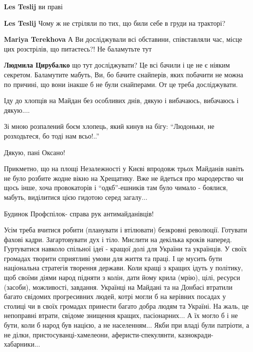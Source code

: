 \begin{itemize}
\begin{itemize}
\textbf{Les Teslij} ви праві

\textbf{Les Teslij} Чому ж не стріляли по тих, що били себе в груди на тракторі?

\textbf{Mariya Terekhova} А Ви досліджували всі обставини, співставляли час, місце цих розстрілів, що питаєтесь?! Не баламутьте тут

\textbf{Людмила Цирубалко} що тут досліджувати? Це всі бачили і це не є ніяким секретом. Баламутите мабуть, Ви, бо бачите снайперів, яких побачити не можна по причині, що вони інакше б не були снайперами. От це треба досліджувати.

\end{itemize} %


Іду до хлопців на Майдан без особливих днів, дякую і вибачаюсь, вибачаюсь і
дякую....

Зі мною розпалений боєм хлопець, який кинув на бігу: \enquote{Людоньки, не розходьтеся,
бо тоді нам всьо!..}

Дякую, пані Оксано!



Прикметно, що на площі Незалежності у Києві впродовж трьох Майданів навіть не
було розбите жодне вікно на Хрещатику. Вже не йдеться про мародерство чи щось
інше, хоча провокаторів і \enquote{одкб}-ешників там було чимало - боялися, мабуть,
виділитися цією гидотою серед загалу...

Будинок Профспілок- справа рук антимайданівців!



Усім треба вчитися робити (планувати і втілювати) безкровні революції. Готувати
фахові кадри. Загартовувати дух і тіло. Мислити на декілька кроків наперед.
Гуртуватися навколо спільної ідеї - кращої долі для України та українців. У
своїх громадах творити сприятливі умови для життя та праці. І це мусить бути
національна стратегія творення держави. Коли кращі з кращих ідуть у політику,
щоб своїми діями народ підняти з колін, дати йому крила (мрію), цілі, ресурси
(засоби), можливості, завдання. Українці на Майдані та на Донбасі втратили
багато свідомих прогресивних людей, котрі могли б на керівних посадах у столиці
чи в своїх громадах принести багато добра людям та Україні. На жаль, це
непоправні втрати, свідоме знищення кращих, пасіонарних... А їх могло б і не
бути, коли б народ був нацією, а не населенням... Якби при владі були патріоти,
а не ділки, пристосуванці-хамелеони, аферисти-спекулянти,
казнокради-хабарники... 


\end{itemize}
